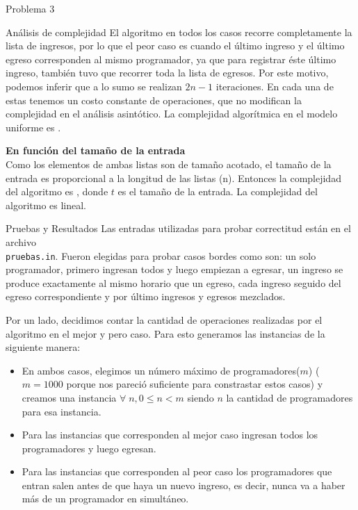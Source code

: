 \begin{section}{Problema 3}
\begin{subsection}{Análisis de complejidad}
El algoritmo en todos los casos recorre completamente la lista de ingresos, por lo que el peor caso es cuando el último ingreso y el último egreso corresponden al mismo programador, ya que para registrar éste último ingreso, también tuvo que recorrer toda la lista de egresos. Por este motivo, podemos inferir que a lo sumo se realizan $2n -1$ iteraciones. En cada una de estas tenemos un costo constante de operaciones, que no modifican la complejidad en el análisis asintótico. La complejidad algorítmica en el modelo uniforme es .\VSP

		\noindent\textbf{En función del tamaño de la entrada}\\

			Como los elementos de ambas listas son de tamaño acotado, el tamaño de la entrada es proporcional a la longitud de las listas (n). Entonces la complejidad del algoritmo es , donde $t$ es el tamaño de la entrada. La complejidad del algoritmo es lineal.
	\end{subsection}

	\begin{subsection}{Pruebas y Resultados}
	Las entradas utilizadas para probar correctitud están en el archivo\\ \texttt{pruebas.in}. Fueron elegidas para probar casos bordes como son: un solo programador, primero ingresan todos y luego empiezan a egresar, un ingreso se produce exactamente al mismo horario que un egreso, cada ingreso seguido del egreso correspondiente y por último ingresos y egresos mezclados.

	Por un lado, decidimos contar la cantidad de operaciones realizadas por el algoritmo en el mejor y pero caso. Para esto generamos las instancias de la siguiente manera:
	\begin{itemize}
		\item En ambos casos, elegimos un número máximo de programadores($m$) ($m=1000$ porque nos pareció suficiente para constrastar estos casos) y creamos una instancia $\forall\;n,0\leq n < m$ siendo $n$ la cantidad de programadores para esa instancia.
		\item Para las instancias que corresponden al mejor caso ingresan todos los programadores y luego egresan.
		\item Para las instancias que corresponden al peor caso los programadores que entran salen antes de que haya un nuevo ingreso, es decir, nunca va a haber más de un programador en simultáneo.
	\end{itemize}


\end{subsection}
\end{section}
